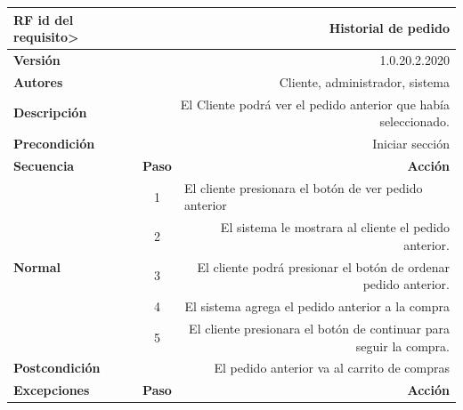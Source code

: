 \documentclass[conference]{IEEEtran}
\begin{document}
\begin{table}[H]
  \centering
  \begin{adjustbox}{width=0.44\textwidth}
    \begin{tabular}{|p{11.215em}|r|r|}
    \toprule
    \textbf{RF id del requisito>} & \multicolumn{2}{p{37.355em}|}{\textbf{Historial de pedido}} \\
    \midrule
    \textbf{Versión} & \multicolumn{2}{p{37.355em}|}{1.0.20.2.2020} \\
    \midrule
    \textbf{Autores} & \multicolumn{2}{p{37.355em}|}{Cliente, administrador, sistema} \\
    \midrule
    \textbf{Descripción} & \multicolumn{2}{p{37.355em}|}{El Cliente podrá ver el pedido anterior que había seleccionado. } \\
    \midrule
    \textbf{Precondición} & \multicolumn{2}{p{37.355em}|}{Iniciar sección} \\
    \midrule
    \textbf{Secuencia} & \multicolumn{1}{p{5.355em}|}{\textbf{Paso}} & \multicolumn{1}{p{32em}|}{\textbf{Acción}} \\
    \midrule
    \multirow{6}[10]{*}{\textbf{Normal}} & \multicolumn{1}{c|}{\multirow{2}[2]{*}{1}} & \multicolumn{1}{l|}{\multirow{2}[2]{*}{El cliente presionara el botón de ver pedido anterior }} \\
    \multicolumn{1}{|c|}{} &       &  \\
\cmidrule{2-3}    \multicolumn{1}{|c|}{} & \multicolumn{1}{c|}{2} & \multicolumn{1}{p{32em}|}{El sistema le mostrara al cliente el pedido anterior.} \\
\cmidrule{2-3}    \multicolumn{1}{|c|}{} & \multicolumn{1}{c|}{3} & \multicolumn{1}{p{32em}|}{El cliente podrá presionar el botón de ordenar pedido anterior.} \\
\cmidrule{2-3}    \multicolumn{1}{|c|}{} & \multicolumn{1}{c|}{4} & \multicolumn{1}{p{32em}|}{El sistema agrega el pedido anterior a la compra} \\
\cmidrule{2-3}    \multicolumn{1}{|c|}{} & \multicolumn{1}{c|}{5} & \multicolumn{1}{p{32em}|}{El cliente presionara el botón de continuar para seguir la compra.} \\
    \midrule
    \textbf{Postcondición} & \multicolumn{2}{p{37.355em}|}{El pedido anterior va al carrito de compras} \\
    \midrule
    \multirow{3}[4]{*}{\textbf{Excepciones}} & \multicolumn{1}{p{5.355em}|}{\textbf{Paso}} & \multicolumn{1}{p{32em}|}{\textbf{Acción}} \\

\end{tabular}
\end{adjustbox}
\end{table}
\end{document}
